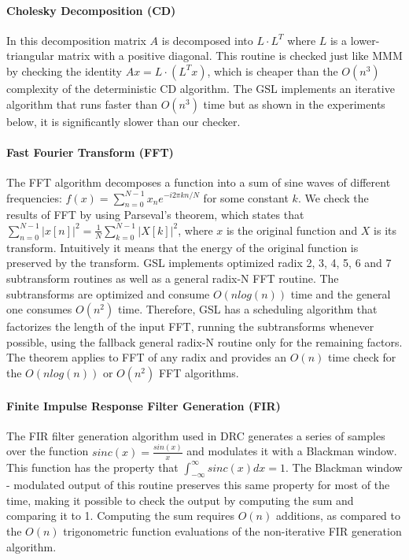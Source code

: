\documentclass{sig-alternate}
\begin{document}
\vspace{-5pt}
\paragraph{Cholesky Decomposition (CD)}
In this decomposition matrix $A$ is decomposed into $L \cdot L^T$ where $L$ is a lower-triangular matrix with a positive diagonal.
This routine is checked just like MMM by checking the identity $Ax = L \cdot (L^T x)$, which is cheaper than the $O(n^3)$ complexity of the deterministic CD algorithm.
The GSL implements an iterative algorithm that runs faster than $O(n^3)$ time but as shown in the experiments below, it is significantly slower than our checker.

\vspace{-5pt}
\paragraph{Fast Fourier Transform (FFT)}
The FFT algorithm decomposes a function into a sum of sine waves of different frequencies: $f(x) = \sum_{n=0}^{N-1} x_n e^{-i2\pi k n / N}$ for some constant $k$.
We check the results of FFT by using Parseval's theorem, which states that $\sum_{n=0}^{N-1} \left| x[n] \right|^2 = \frac{1}{N} \sum_{k=0}^{N-1} \left| X[k] \right|^2$, where $x$ is the original function and $X$ is its transform.
Intuitively it means that the energy of the original function is preserved by the transform.
GSL implements optimized radix 2, 3, 4, 5, 6 and 7 subtransform routines as well as a general radix-N FFT routine. The subtransforms are optimized and consume $O(n log(n))$ time and the general one consumes $O(n^2)$ time. Therefore, GSL has a scheduling algorithm that factorizes the length of the input FFT, running the subtransforms whenever possible, using the fallback general radix-N routine only for the remaining factors.
The theorem applies to FFT of any radix and provides an $O(n)$ time check for the $O(n log(n))$ or $O(n^2)$ FFT algorithms.

\vspace{-5pt}
\paragraph{Finite Impulse Response Filter Generation (FIR)}
The FIR filter generation algorithm used in DRC generates a series of samples over the function $sinc(x)=\frac{sin(x)}{x}$
and modulates it with a Blackman window.
This function has the property that $\int_{-\infty}^{\infty} sinc(x)dx = 1$.
The Blackman window - modulated output of this routine preserves this same property for most of the time, making it possible to check the output by computing the sum and comparing it to 1.
Computing the sum requires $O(n)$ additions, as compared to the $O(n)$ trigonometric function evaluations of the non-iterative FIR generation algorithm.
\end{document}
